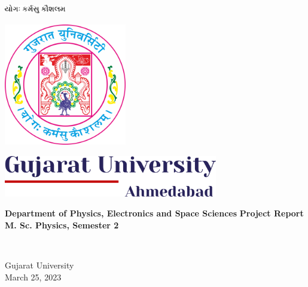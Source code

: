 \documentclass[17pt,a4paper]{extarticle}%
\begin{document}
\begin{titlepage}
\centering
  
\begin{center}
    \includegraphics[width=0.2\textwidth]{yogam.png}
\end{center}
\begin{center}
    \includegraphics[width=0.4\textwidth]{logo_em.png}
\end{center}

\vfill

\begin{center}
    \includegraphics[width=0.7\textwidth]{gujuni.png}
\end{center}
\vspace{1cm}
\begin{large}
\textbf{Department of Physics,
Electronics and Space Sciences}
\vfill
\textbf{Project Report}\\
\textbf{M. Sc. Physics, Semester 2}
\end{large}\\[10pt]
\vfill



\vfill

Gujarat University\\[2.5pt]
March 25, 2023
\end{titlepage}





  
  
\end{document}
